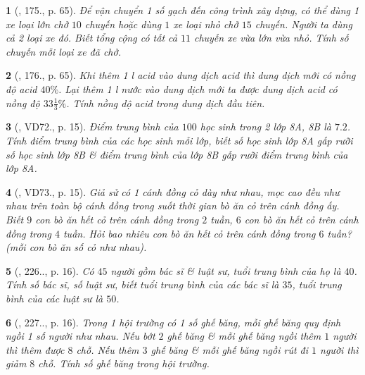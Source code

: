 \documentclass{article}
\newtheorem{baitoan}{}
\begin{document}
\begin{baitoan}[\cite{Tuyen_Toan_9_old}, 175., p. 65]
	Để vận chuyển 1 số gạch đến công trình xây dựng, có thể dùng 1 xe loại lớn chở $10$ chuyến hoặc dùng $1$ xe loại nhỏ chở $15$ chuyến. Người ta dùng cả 2 loại xe đó. Biết tổng cộng có tất cả $11$ chuyến xe vừa lớn vừa nhỏ. Tính số chuyến mỗi loại xe đã chở.
\end{baitoan}

\begin{baitoan}[\cite{Tuyen_Toan_9_old}, 176., p. 65]
	Khi thêm {\rm 1 l} acid vào dung dịch acid thì dung dịch mới có nồng độ acid $40\%$. Lại thêm {\rm 1 l} nước vào dung dịch mới ta được dung dịch acid có nồng độ $33\frac{1}{3}\%$. Tính nồng dộ acid trong dung dịch đầu tiên.
\end{baitoan}

\begin{baitoan}[\cite{Binh_Toan_9_tap_2}, VD72., p. 15]
	Điểm trung bình của $100$ học sinh trong 2 lớp 8A, 8B là $7.2$. Tính điểm trung bình của các học sinh mỗi lớp, biết số học sinh lớp 8A gấp rưỡi số học sinh lớp 8B \& điểm trung bình của lớp 8B gấp rưỡi điểm trung bình của lớp 8A.
\end{baitoan}

\begin{baitoan}[\cite{Binh_Toan_9_tap_2}, VD73., p. 15]
	Giả sử có 1 cánh đồng cỏ dày như nhau, mọc cao đều như nhau trên toàn bộ cánh đồng trong suốt thời gian bò ăn cỏ trên cánh đồng ấy. Biết $9$ con bò ăn hết cỏ trên cánh đồng trong $2$ tuần, $6$ con bò ăn hết cỏ trên cánh đồng trong $4$ tuần. Hỏi bao nhiêu con bò ăn hết cỏ trên cánh đồng trong $6$ tuần? (mỗi con bò ăn số cỏ như nhau).
\end{baitoan}

\begin{baitoan}[\cite{Binh_Toan_9_tap_2}, 226.., p. 16]
	Có $45$ người gồm bác sĩ \& luật sư, tuổi trung bình của họ là $40$. Tính số bác sĩ, số luật sư, biết tuổi trung bình của các bác sĩ là $35$, tuổi trung bình của các luật sư là $50$.
\end{baitoan}

\begin{baitoan}[\cite{Binh_Toan_9_tap_2}, 227.., p. 16]
	Trong 1 hội trường có 1 số ghế băng, mỗi ghế băng quy định ngồi 1 số người như nhau. Nếu bớt $2$ ghế băng \& mỗi ghế băng ngồi thêm $1$ người thì thêm được $8$ chỗ. Nếu thêm $3$ ghế băng \& mỗi ghế băng ngồi rút đi $1$ người thì giảm $8$ chỗ. Tính số ghế băng trong hội trường.
\end{baitoan}
\end{document}
